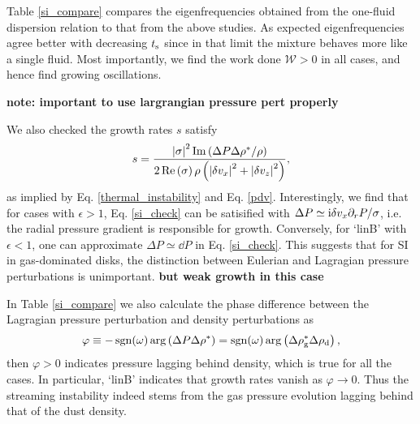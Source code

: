 Table \ref{si_compare} compares the eigenfrequencies obtained from the
one-fluid dispersion relation to that from the above studies. As  
expected eigenfrequencies agree better with decreasing $t_\mathrm{s}$ since
in that limit the mixture behaves more like a single fluid. Most 
importantly, we find the work done $\mathcal{W}>0$ in all cases, and
hence find growing oscillations. 

{\bf note: important to use largrangian pressure pert properly}

We also checked the growth rates $s$ satisfy 
\begin{align} 
  s = \frac{\left|\sigma\right|^2\operatorname{Im}\left(\Delta P
    \Delta\rho^*/\rho\right)}{2\operatorname{Re}\left(\sigma\right)\rho\left(\left|\delta
  v_x\right|^2+\left|\delta
  v_z\right|^2\right)}, \label{si_check}
\end{align}
as implied by Eq. \ref{thermal_instability} and
Eq. \ref{pdv}. %
Interestingly, we find that for cases with
$\epsilon>1$, Eq. \ref{si_check} can be satisified with $\Delta
P\simeq \mathrm{i}\delta v_x \partial_rP/\sigma$, i.e. the radial pressure gradient
is responsible for growth. Conversely, for `linB' with $\epsilon
< 1$, one can approximate $\Delta P \simeq \dd P$ in Eq. \ref{si_check}. This
suggests that for SI in gas-dominated disks, the distinction between
Eulerian and Lagragian pressure perturbations is unimportant. 
{\bf but weak growth in this case}

In Table \ref{si_compare} we also calculate the phase difference
between the Lagragian pressure perturbation and density perturbations
as    
\begin{align*} 
\varphi \equiv -\operatorname{sgn}(\omega)\arg\left(\Delta P\Delta\rho^*\right)
        = \operatorname{sgn}(\omega)\arg\left(\Delta\rho_\mathrm{g}^*\Delta\rho_\mathrm{d}\right),\notag
\end{align*}
then $\varphi > 0 $ indicates pressure lagging behind density, which
is true for all the cases. In particular, `linB' indicates that growth
rates vanish as $\varphi \to 0$.  
Thus the streaming instability indeed stems  
from the gas pressure evolution lagging behind that of the dust 
density. 




